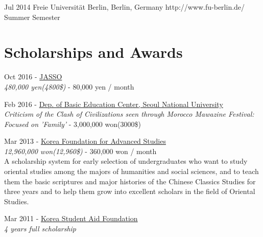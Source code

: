 \documentclass[10pt]{article} %
\begin{document}

\job
{Jul 2014}{}
{Freie Universität Berlin, Berlin, Germany}
{http://www.fu-berlin.de/}
{Summer Semester}

\if{}

\section{Scholarships and Awards}

{
Oct 2016 - \href{http://www.jasso.go.jp/ryugaku/tantosha/study_a/short_term_h/index.html}{JASSO}\\
\textit{480,000 yen(4800\$)} - 80,000 yen / month\\
}

{
Feb 2016 - \href{http://liberaleduenglish.snu.ac.kr/}{Dep. of Basic Education Center, Seoul National University}\\
\textit{Criticism of the Clash of Civilizations seen through Morocco Mawazine Festival: Focused on 'Family'} - 3,000,000 won(3000\$)\\
}

{
Mar 2013 - \href{http://www.kfas.or.kr/?pCulture=en}{Korea Foundation for Advanced Studies}\\
\textit{12,960,000 won(12,960\$)} - 360,000 won / month\\
A scholarship system for early selection of undergraduates who want to study oriental studies among the majors of humanities and social sciences, and to teach them the basic scriptures and major histories of the Chinese Classics Studies for three years and to help them grow into excellent scholars in the field of Oriental Studies.
}

{
Mar 2011 - \href{http://eng.kosaf.go.kr/jsp/main.jsp}{Korea Student Aid Foundation}\\
\textit{4 years full scholarship}\\
}
\fi
\end{document}
